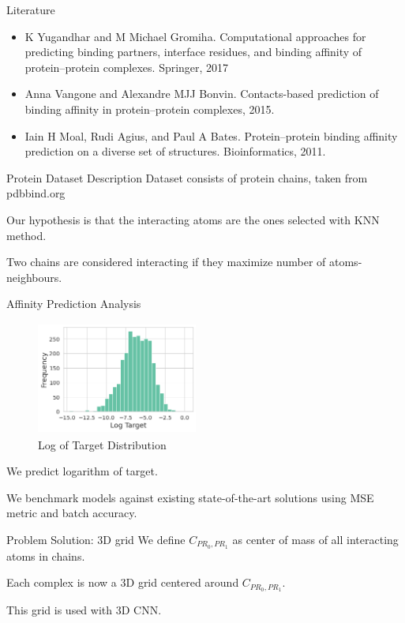 \documentclass{beamer}
\begin{document}
\begin{frame}{Literature}
\begin{itemize}
        \item K Yugandhar and M Michael Gromiha. Computational approaches for predicting binding partners, interface residues, and binding affinity of protein–protein complexes. Springer, 2017 
        \item Anna Vangone and Alexandre MJJ Bonvin. Contacts-based prediction of binding affinity in protein–protein complexes, 2015. 
        \item Iain H Moal, Rudi Agius, and Paul A Bates. Protein–protein binding affinity prediction on a diverse set of structures. Bioinformatics, 2011.
\end{itemize}
\end{frame}

\begin{frame}{Protein Dataset Description}
Dataset consists of protein chains, taken from pdbbind.org
\bigskip

Our hypothesis is that the interacting atoms are the ones selected with KNN method.
\bigskip

Two chains are considered interacting if they maximize number of atoms-neighbours.
\end{frame}

\begin{frame}{Affinity Prediction Analysis}
\begin{figure}
\includegraphics[width=200px, height=140px]{logM.png}
\caption{\label{fig:your-figure}Log of Target Distribution}
\end{figure}

We predict logarithm of target.

We benchmark models against existing state-of-the-art solutions using MSE metric and batch accuracy.
\end{frame}

\begin{frame}{Problem Solution: 3D grid}
We define $C_{PR_0, PR_1}$ as center of mass of all interacting atoms in chains.
\bigskip

Each complex is now a 3D grid centered around $C_{PR_0, PR_1}$.
\bigskip

This grid is used with 3D CNN.
\end{frame}
\end{document}
